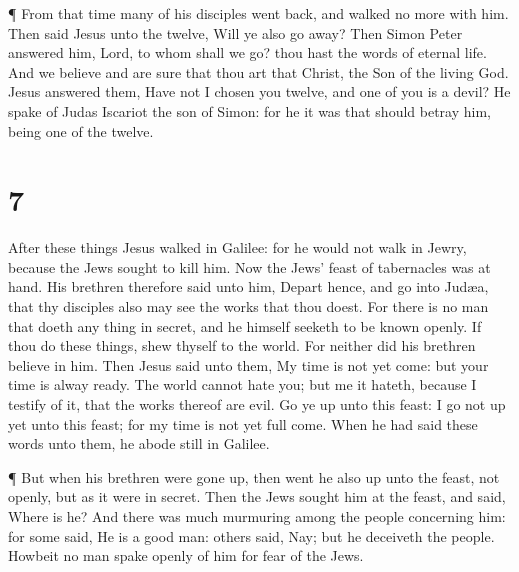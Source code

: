  ¶ From that time many of his disciples went back, and
walked no more with him.  Then said Jesus unto the twelve,
Will ye also go away?  Then Simon Peter answered him, Lord,
to whom shall we go? thou hast the words of eternal life. 
And we believe and are sure that thou art that Christ, the Son of the
living God.  Jesus answered them, Have not I chosen you
twelve, and one of you is a devil?  He spake of Judas
Iscariot the son of Simon: for he it was that should betray him, being
one of the twelve.

\hypertarget{section-6}{%
\section{7}\label{section-6}}

 After these things Jesus walked in Galilee: for he would
not walk in Jewry, because the Jews sought to kill him.  Now
the Jews' feast of tabernacles was at hand.  His brethren
therefore said unto him, Depart hence, and go into Judæa, that thy
disciples also may see the works that thou doest.  For there
is no man that doeth any thing in secret, and he himself seeketh to be
known openly. If thou do these things, shew thyself to the world.
 For neither did his brethren believe in him. 
Then Jesus said unto them, My time is not yet come: but your time is
alway ready.  The world cannot hate you; but me it hateth,
because I testify of it, that the works thereof are evil. 
Go ye up unto this feast: I go not up yet unto this feast; for my time
is not yet full come.  When he had said these words unto
them, he abode still in Galilee.

 ¶ But when his brethren were gone up, then went he also up
unto the feast, not openly, but as it were in secret.  Then
the Jews sought him at the feast, and said, Where is he? 
And there was much murmuring among the people concerning him: for some
said, He is a good man: others said, Nay; but he deceiveth the people.
 Howbeit no man spake openly of him for fear of the Jews.


